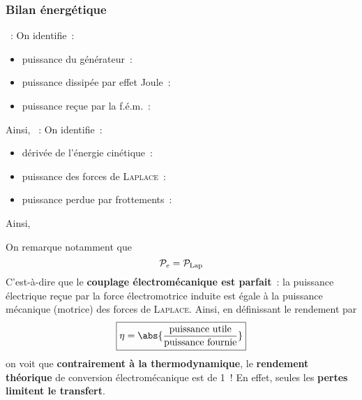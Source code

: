 \documentclass[../main/main.tex]{subfiles}
\begin{document}
\subsubsection{Bilan énergétique}
\label{sssec:rlplmot_bilanrj}
\begin{itemize}[label=$\diamond$, leftmargin=10pt]
  ~:  On identifie~:
  \begin{itemize}[label=$\triangleright$, leftmargin=20pt]
    \item puissance du générateur~: 
    \item puissance dissipée par effet Joule~: 
    \item puissance reçue par la f.é.m.~: 
  \end{itemize}
  Ainsi,
  ~:  On identifie~:
  \begin{itemize}[label=$\triangleright$, leftmargin=20pt]
    \item dérivée de l'énergie cinétique~: 
    \item puissance des forces de \textsc{Laplace}~: 
    \item puissance perdue par frottements~: 
  \end{itemize}
  Ainsi,
\end{itemize}
On remarque notamment que
\[
  \mathcal{P}_e = \mathcal{P}_{\rm Lap}
\]
C'est-à-dire que le \textbf{couplage électromécanique est parfait}~: la
puissance électrique reçue par la force électromotrice induite est égale à la
puissance mécanique (motrice) des forces de \textsc{Laplace}. Ainsi, en
définissant le rendement par
\[
  \boxed{\eta = \abs{\frac{\text{puissance utile}}{\text{puissance fournie}}}}
\]
on voit que \textbf{contrairement à la thermodynamique}, le \textbf{rendement
théorique} de conversion électromécanique est de 1~! En effet, seules les
\textbf{pertes limitent le transfert}.
\end{document}
